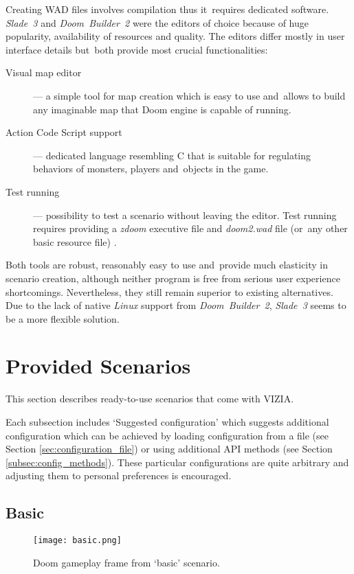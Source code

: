 	Creating WAD files involves compilation thus it~requires dedicated software. \emph{Slade~3} and \emph{Doom~Builder~2} were the editors of choice because of huge popularity, availability of resources and quality. The editors differ mostly in user interface details but~both provide most crucial functionalities:

	\begin{description}
		\item [Visual map editor] --- a simple tool for map creation which is easy to use and~allows to build any imaginable map that Doom engine is capable of running.
		\item [Action Code Script support] --- dedicated language resembling C that is suitable for regulating behaviors of monsters, players and~objects in the game.
		\item [Test running] --- possibility to test a scenario without leaving the editor. Test running requires providing a \emph{zdoom} executive file and \emph{doom2.wad} file (or~any other basic resource file) . 
	\end{description}

	Both tools are robust, reasonably easy to use and~provide much elasticity in scenario creation, although neither program is free from serious user experience shortcomings. Nevertheless, they still remain superior to existing alternatives. Due to the lack of native \emph{Linux} support from \emph{Doom~Builder~2}, \emph{Slade~3} seems to be a more flexible solution. 

	\newpage
\section{Provided Scenarios}\label{sec:scenarios}
	This section describes ready-to-use scenarios that come with VIZIA.

	Each subsection includes `Suggested configuration' which suggests additional configuration which can be achieved by loading	configuration from a file (see Section \ref{sec:configuration_file}) or using additional API methods (see Section \ref{subsec:config_methods}). These particular configurations are quite arbitrary and adjusting them to personal preferences is encouraged.

	\subsection{Basic}\label{subsec:basic}
		
		\begin{figure}
			\centering
			\texttt{[image: basic.png]}
			\caption{Doom gameplay frame from `basic' scenario.}\label{fig:basic}
		\end{figure}

